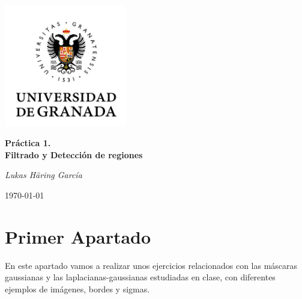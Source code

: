 \documentclass{article}
\begin{document}
\begin{titlepage}
	\centering
	{\includegraphics[width=0.4\textwidth]{assets/logo.jpg} \par}
	\vspace{3cm}
	{\huge\bfseries Práctica 1.\\ Filtrado y Detección de regiones \par}
	\vspace{2cm}
	{\Large\itshape Lukas Häring García\par}
	\vfill
	\vfill

	{\large \today\par}
\end{titlepage}

\tableofcontents
\newpage

\section{Primer Apartado}
En este apartado vamos a realizar unos ejercicios relacionados con las máscaras gaussianas y las laplacianas-gaussianas estudiadas en clase, con diferentes ejemplos de imágenes, bordes y sigmas.
\end{document}
